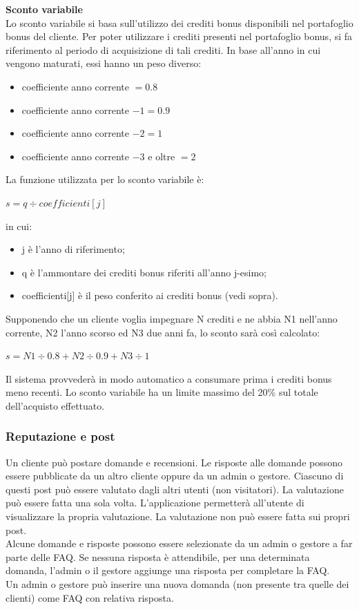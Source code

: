 \documentclass[a4paper, 14pt]{article}
\begin{document}
\begin{flushleft}
				\bigskip \textbf{Sconto variabile} \\ \smallskip
				Lo sconto variabile si basa sull'utilizzo dei crediti bonus disponibili nel portafoglio bonus del cliente.
				Per poter utilizzare i crediti presenti nel portafoglio bonus, si fa riferimento
				al periodo di acquisizione di tali crediti. In base all’anno in cui vengono maturati, essi hanno
				un peso diverso:
				\begin{itemize}
					\item coefficiente anno corrente $ = 0.8 $
					\item coefficiente anno corrente $ - 1 = 0.9 $
					\item coefficiente anno corrente $ - 2 = 1 $
					\item coefficiente anno corrente $ - 3 $ e oltre $ = 2 $
				\end{itemize}
				La funzione utilizzata per lo sconto variabile è: \\
				 \begin{center}
				 	$ s = q \div coefficienti[j] $
				 \end{center}
				\newpage in cui:
				\begin{itemize}
					\item j è l’anno di riferimento;
					\item q è l’ammontare dei crediti bonus riferiti all’anno j-esimo;
					\item coefficienti[j] è il peso conferito ai crediti bonus (vedi sopra).
				\end{itemize}

				Supponendo che un cliente voglia impegnare N crediti e ne abbia N1 nell'anno corrente, N2
				l'anno scorso ed N3 due anni fa, lo sconto sarà così calcolato: 
				\begin{center}
					$ s = N1\div0.8 + N2\div0.9 + N3\div1 $\\
				\end{center}
				Il sistema provvederà in modo automatico a consumare prima i crediti bonus meno recenti.
				Lo sconto variabile ha un limite massimo del 20\% sul totale dell'acquisto effettuato.
				
			\subsubsection{Reputazione e post} \label{RepPost}
				Un cliente può postare domande e recensioni. Le risposte alle domande possono essere pubblicate da un altro cliente oppure
				da un admin o gestore.
				Ciascuno di questi post può essere valutato dagli altri utenti (non visitatori).
				La valutazione può essere fatta una sola volta. L'applicazione permetterà all'utente di visualizzare la propria valutazione.
				La valutazione non può essere fatta sui propri post.\\
				Alcune domande e risposte possono essere selezionate da un admin o gestore a far parte delle FAQ.
				Se nessuna risposta è attendibile, per una determinata domanda, l'admin o il gestore aggiunge una risposta per completare la FAQ.\\
				Un admin o gestore può inserire una nuova domanda (non presente tra quelle dei clienti) come FAQ con relativa risposta.
				

\end{flushleft}
\end{document}
